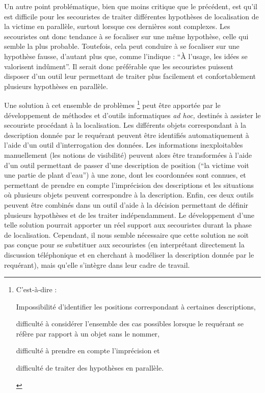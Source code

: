 Un autre point problématique, bien que moins critique que le
précédent, est qu'il est difficile pour les secouristes de traiter
différentes hypothèses de localisation de la victime en parallèle,
surtout lorsque ces dernières sont complexes. Les secouristes ont donc
tendance à se focaliser sur une même hypothèse, celle qui semble la
plus probable. Toutefois, cela peut conduire à se focaliser sur une
hypothèse fausse, d’autant plus que, comme l'indique
\textcite{Bachelard1934} : \enquote{À l'usage, les idées se valorisent
  indûment}. Il serait donc préférable que les secouristes puissent
disposer d'un outil leur permettant de traiter plus facilement et
confortablement plusieurs hypothèses en parallèle.

Une solution à cet ensemble de problèmes \footnote{C'est-à-dire :%
  \begin{enumerate*}[label=(\arabic*)]
  \item Impossibilité d'identifier les positions correspondant à
    certaines descriptions,
  \item difficulté à considérer l'ensemble des cas possibles lorsque
    le requérant se réfère par rapport à un objet sans le nommer,
  \item difficulté à prendre en compte l'imprécision et
  \item difficulté de traiter des hypothèses en parallèle.
  \end{enumerate*}} peut être apportée par le développement de
méthodes et d'outils informatiques \emph{ad hoc,} destinés à assister
le secouriste procédant à la localisation. Les différents objets
correspondant à la description donnée par le requérant peuvent être
identifiés automatiquement à l'aide d'un outil d’interrogation des
données. Les informations inexploitables manuellement (\eg les notions
de visibilité) peuvent alors être transformées à l'aide d'un outil
permettant de passer d'une description de position (\eg \enquote{la
  victime voit une partie de plant d'eau}) à une zone, dont les
coordonnées sont connues, et permettant de prendre en compte
l'imprécision des descriptions et les situations où plusieurs objets
peuvent correspondre à la description. Enfin, ces deux outils peuvent
être combinés dans un outil d'aide à la décision permettant de définir
plusieurs hypothèses et de les traiter indépendamment. Le
développement d'une telle solution pourrait apporter un réel support
aux secouristes durant la phase de localisation. Cependant, il nous
semble nécessaire que cette solution ne soit pas conçue pour se
substituer aux secouristes (\eg en interprétant directement la
discussion téléphonique et en cherchant à modéliser la description
donnée par le requérant), mais qu'elle s'intègre dans leur cadre de
travail.


